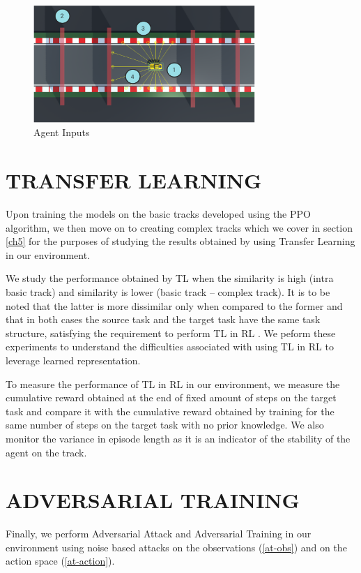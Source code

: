 \begin{figure}[H]
    \centering
    \includegraphics[width=0.75\textwidth]{images/UnityEnv.png}
    \caption{Agent Inputs}
    \label{fig:agent-inputs}
\end{figure}

\section{TRANSFER LEARNING} \label{ch4TL}
%
Upon training the models on the basic tracks developed using the PPO
algorithm, we then move on to creating complex tracks which we cover
in section \ref{ch5} for the purposes of studying the results obtained
by using Transfer Learning in our environment.

We study the performance obtained by TL when the similarity is high
(intra basic track) and similarity is lower (basic track -- complex
track). It is to be noted that the latter is more dissimilar only when
compared to the former and that in both cases the source task and the
target task have the same task structure, satisfying the requirement
to perform TL in RL \cite{TLRLImplement}. We peform these experiments
to understand the difficulties associated with using TL in RL to
leverage learned representation.

To measure the performance of TL in RL in our environment, we measure
the cumulative reward obtained at the end of fixed amount of steps on
the target task and compare it with the cumulative reward obtained by
training for the same number of steps on the target task with no prior
knowledge. We also monitor the variance in episode length as it is an
indicator of the stability of the agent on the track.


\section{ADVERSARIAL  TRAINING} \label{ch4AT}

Finally, we perform Adversarial Attack and Adversarial Training in our
environment using noise based attacks on the observations
(\ref{at-obs}) and on the action space (\ref{at-action}).

